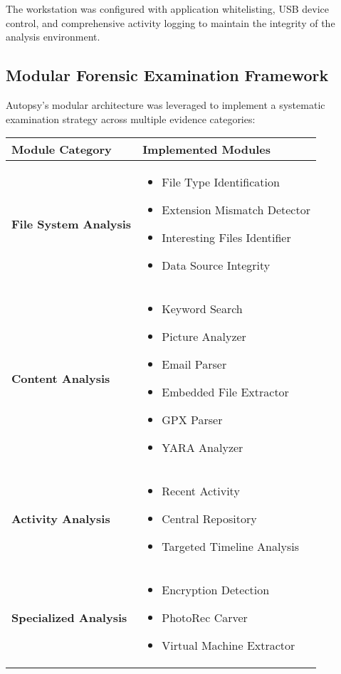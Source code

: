 The workstation was configured with application whitelisting, USB device control, and comprehensive activity logging to maintain the integrity of the analysis environment.

\subsection{Modular Forensic Examination Framework}
Autopsy's modular architecture was leveraged to implement a systematic examination strategy across multiple evidence categories:

\begin{table}[h]
\centering
\begin{tabular}{|p{5cm}|p{10cm}|}
\hline
\textbf{Module Category} & \textbf{Implemented Modules} \\
\hline
\textbf{File System Analysis} & 
\begin{itemize}
    \item File Type Identification
    \item Extension Mismatch Detector
    \item Interesting Files Identifier
    \item Data Source Integrity
\end{itemize} \\
\hline
\textbf{Content Analysis} & 
\begin{itemize}
    \item Keyword Search
    \item Picture Analyzer
    \item Email Parser
    \item Embedded File Extractor
    \item GPX Parser
    \item YARA Analyzer
\end{itemize} \\
\hline
\textbf{Activity Analysis} & 
\begin{itemize}
    \item Recent Activity
    \item Central Repository
    \item Targeted Timeline Analysis
\end{itemize} \\
\hline
\textbf{Specialized Analysis} & 
\begin{itemize}
    \item Encryption Detection
    \item PhotoRec Carver
    \item Virtual Machine Extractor

\end{itemize}
\end{tabular}
\end{table}
